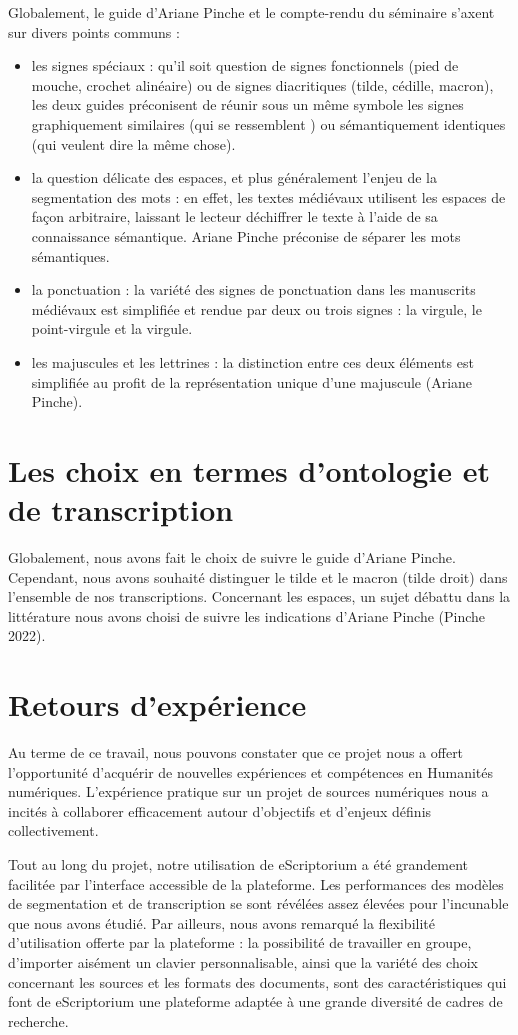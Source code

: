 \documentclass[12pt,a4paper]{article}
\begin{document}
Globalement, le guide d’Ariane Pinche et le compte-rendu du séminaire s’axent sur divers points communs : 
\begin{itemize}
	\item les signes spéciaux : qu’il soit question de signes fonctionnels (pied de mouche, crochet alinéaire) ou de signes diacritiques (tilde, cédille, macron), les deux guides préconisent de réunir sous un même symbole les signes graphiquement similaires (qui se ressemblent ) ou sémantiquement identiques (qui veulent dire la même chose).
	\item la question délicate des espaces, et plus généralement l’enjeu de la segmentation des mots : en effet, les textes médiévaux utilisent les espaces de façon arbitraire, laissant le lecteur déchiffrer le texte à l’aide de sa connaissance sémantique. Ariane Pinche préconise de séparer les mots sémantiques. 
	\item la ponctuation : la variété des signes de ponctuation dans les manuscrits médiévaux est simplifiée et rendue par deux ou trois signes : la virgule, le point-virgule et la virgule. 
	\item les majuscules et les lettrines : la distinction entre ces deux éléments est simplifiée au profit de la représentation unique d’une majuscule (Ariane Pinche).
\end{itemize}

\section{Les choix en termes d’ontologie et de transcription}
Globalement, nous avons fait le choix de suivre le guide d’Ariane Pinche. Cependant, nous avons souhaité distinguer le tilde et le macron (tilde droit) dans l’ensemble de nos transcriptions. Concernant les espaces, un sujet débattu dans la littérature nous avons choisi de suivre les indications d’Ariane Pinche (Pinche 2022). 

\section{Retours d’expérience}
Au terme de ce travail, nous pouvons constater que ce projet nous a offert l'opportunité d'acquérir de nouvelles expériences et compétences en Humanités numériques. L'expérience pratique sur un projet de sources numériques nous a incités à collaborer efficacement autour d'objectifs et d'enjeux définis collectivement. 

Tout au long du projet, notre utilisation de eScriptorium a été grandement facilitée par l'interface accessible de la plateforme. Les performances des modèles de segmentation et de transcription se sont révélées assez élevées pour l'incunable que nous avons étudié. Par ailleurs, nous avons remarqué la flexibilité d'utilisation offerte par la plateforme : la possibilité de travailler en groupe, d'importer aisément un clavier personnalisable, ainsi que la variété des choix concernant les sources et les formats des documents, sont des caractéristiques qui font de eScriptorium une plateforme adaptée à une grande diversité de cadres de recherche.\\
\end{document}
